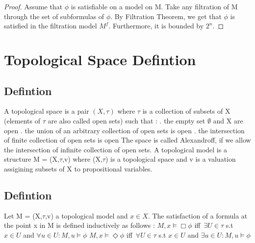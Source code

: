\documentclass[12pt, a4paper]{scrreprt}
\begin{document}
\begin{proof}
Assume that $\phi$ is satisfiable on a model on M. Take any filtration of M through the set of subformulas of $\phi$. 
By Filtration Theorem, we get that $\phi$ is satisfied in the filtration model $M^f$. Furthermore, it is bounded by $2^n$.

\end{proof}






\chapter{Topological Space Defintion}

\section{Defintion}

A topological space is a pair $(X, \tau)$ where $\tau$ is a collection of subsets of X (elements of $\tau$ are also called open sets) such that : 
\newline
{}. the empty set $\emptyset $ and X are open
. the union of an arbitrary collection of open sets is open
. the intersection of finite collection of open sets is open
\newline
\newline
The space is called Alexandroff, if we allow the intersection of infinite collection of open sets.
A topological model is a structure M = (X,$\tau$,v) where (X,$\tau$) is a topological space
and v is a valuation assigining subsets of X to propositional variables. 

\section{Defintion}
Let M = (X,$\tau$,v) a topological model and $x \in X$. The satisfaction of a formula
at the point x in M is defined inductively as follows :
\newline
$M,x \models \Box \phi$ iff $\, \exists U \in \tau$ s.t $x \in U$ and $\forall u \in U : M,u \models \phi$
\newline
$M,x \models \Diamond \phi$ iff $\, \forall U \in \tau$ s.t $x \in U$ and $\exists u \in U : M,u \models \phi$
\end{document}
